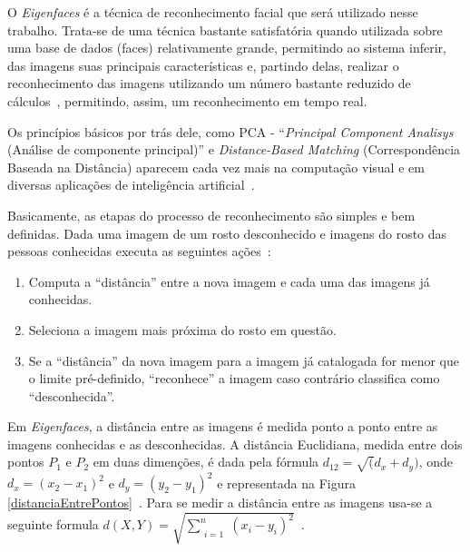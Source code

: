 O \textit{Eigenfaces}	é a técnica de reconhecimento facial que será utilizado nesse trabalho. Trata-se de uma técnica bastante satisfatória quando utilizada sobre uma base de dados (faces) relativamente grande, permitindo ao sistema inferir, das imagens suas principais características e, partindo delas, realizar o reconhecimento das imagens utilizando um número bastante reduzido de cálculos~\cite{artigo-eigenface}, permitindo, assim, um reconhecimento em tempo real.	

Os princípios básicos por trás dele, como PCA - ``\textit{Principal Component Analisys} (Análise de componente principal)'' e \textit{Distance-Based Matching} (Correspondência Baseada na Distância) aparecem cada vez mais na computação visual e em diversas aplicações de inteligência artificial~\cite{hewitt}.

Basicamente, as etapas do processo de reconhecimento são simples e bem definidas. Dada uma imagem de um rosto desconhecido e imagens do rosto das pessoas conhecidas executa as seguintes ações~\cite{hewitt}:

	\begin{enumerate}
		\item Computa a ``distância'' entre a nova imagem e cada uma das imagens já conhecidas.
		\item Seleciona a imagem mais próxima	 do rosto em questão.
		\item Se a ``distância'' da nova imagem para a imagem já catalogada for menor que o limite pré-definido, ``reconhece'' a imagem caso contrário classifica como ``desconhecida''.
	\end{enumerate}

Em \textit{Eigenfaces}, a distância entre as imagens é medida ponto a ponto entre as imagens conhecidas e as desconhecidas. A distância Euclidiana, medida entre dois pontos $P_1$ e $P_2$ em duas dimenções, é dada pela fórmula $\displaystyle d_{12} = \sqrt(d_{x} + d_{y})$, onde $\displaystyle d_x = (x_2 - x_1)^2$ e $\displaystyle d_y = (y_2-y_1)^2$ e representada na Figura \ref{distanciaEntrePontos}~\cite{hewitt}. Para se medir a distância entre as imagens usa-se a seguinte formula $\displaystyle d(X, Y) = \sqrt{\sum_{\substack{i=1}}^{n} (x_i-y_i)^2}$~\cite{compareDistances}.

